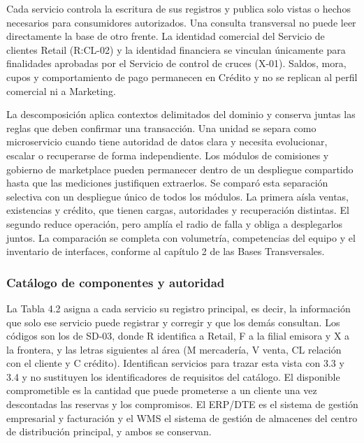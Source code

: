 \documentclass[11pt]{article}
\begin{document}
Cada servicio controla la escritura de sus registros y publica solo vistas o hechos necesarios para consumidores autorizados. Una consulta transversal no puede leer directamente la base de otro frente. La identidad comercial del Servicio de clientes Retail (R:CL-02) y la identidad financiera se vinculan únicamente para finalidades aprobadas por el Servicio de control de cruces (X-01). Saldos, mora, cupos y comportamiento de pago permanecen en Crédito y no se replican al perfil comercial ni a Marketing.

La descomposición aplica contextos delimitados del dominio y conserva juntas las reglas que deben confirmar una transacción. Una unidad se separa como microservicio cuando tiene autoridad de datos clara y necesita evolucionar, escalar o recuperarse de forma independiente. Los módulos de comisiones y gobierno de marketplace pueden permanecer dentro de un despliegue compartido hasta que las mediciones justifiquen extraerlos. Se comparó esta separación selectiva con un despliegue único de todos los módulos. La primera aísla ventas, existencias y crédito, que tienen cargas, autoridades y recuperación distintas. El segundo reduce operación, pero amplía el radio de falla y obliga a desplegarlos juntos. La comparación se completa con volumetría, competencias del equipo y el inventario de interfaces, conforme al capítulo 2 de las Bases Transversales.

\subsubsection{Catálogo de componentes y autoridad}

La Tabla 4.2 asigna a cada servicio su registro principal, es decir, la información que solo ese servicio puede registrar y corregir y que los demás consultan. Los códigos son los de SD-03, donde R identifica a Retail, F a la filial emisora y X a la frontera, y las letras siguientes al área (M mercadería, V venta, CL relación con el cliente y C crédito). Identifican servicios para trazar esta vista con 3.3 y 3.4 y no sustituyen los identificadores de requisitos del catálogo. El disponible comprometible es la cantidad que puede prometerse a un cliente una vez descontadas las reservas y los compromisos. El ERP/DTE es el sistema de gestión empresarial y facturación y el WMS el sistema de gestión de almacenes del centro de distribución principal, y ambos se conservan.

\par\vspace{0pt plus 10\baselineskip}\vspace{0pt plus -10\baselineskip}
\end{document}

